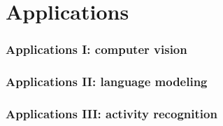 \documentclass[10pt, t, xcolor={usenames,dvipsnames,svgnames}, compress]{beamer}
\begin{document}
\section{Applications}
{
  \begin{frame}[c]
    \sectionpage
  \end{frame}
}

\begin{frame}
  \frametitle{Applications I: computer vision}
  
\end{frame}


\begin{frame}
  \frametitle{Applications II: language modeling}
  
\end{frame}

\begin{frame}
  \frametitle{Applications III: activity recognition}
\end{frame}
\end{document}
